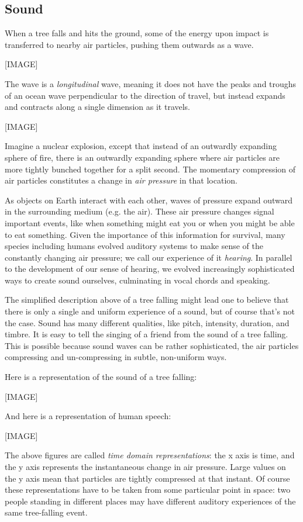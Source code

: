 \documentclass[UTF8]{book}
\begin{document}
\begin{CJK}{UTF8}{gbsn}
\section{Sound}

When a tree falls and hits the ground, some of the energy upon impact is transferred to nearby air particles, pushing them outwards as a wave.

[IMAGE]

The wave is a \emph{longitudinal} wave, meaning it does not have the peaks and troughs of an ocean wave perpendicular to the direction of travel, but instead expands and contracts along a single dimension as it travels.

[IMAGE]

Imagine a nuclear explosion, except that instead of an outwardly expanding sphere of fire, there is an outwardly expanding sphere where air particles are more tightly bunched together for a split second. The momentary compression of air particles constitutes a change in \emph{air pressure} in that location.

As objects on Earth interact with each other, waves of pressure expand outward in the surrounding medium (e.g. the air). These air pressure changes signal important events, like when something might eat you or when you might be able to eat something. Given the importance of this information for survival, many species including humans evolved auditory systems to make sense of the constantly changing air pressure; we call our experience of it \emph{hearing}. In parallel to the development of our sense of hearing, we evolved increasingly sophisticated ways to create sound ourselves, culminating in vocal chords and speaking.

The simplified description above of a tree falling might lead one to believe that there is only a single and uniform experience of a sound, but of course that's not the case. Sound has many different qualities, like pitch, intensity, duration, and timbre. It is easy to tell the singing of a friend from the sound of a tree falling. This is possible because sound waves can be rather sophisticated, the air particles compressing and un-compressing in subtle, non-uniform ways.

Here is a representation of the sound of a tree falling:

[IMAGE]

And here is a representation of human speech:

[IMAGE]

The above figures are called \emph{time domain representations}: the x axis is time, and the y axis represents the instantaneous change in air pressure. Large values on the y axis mean that particles are tightly compressed at that instant. Of course these representations have to be taken from some particular point in space: two people standing in different places may have different auditory experiences of the same tree-falling event.


\end{CJK}
\end{document}
